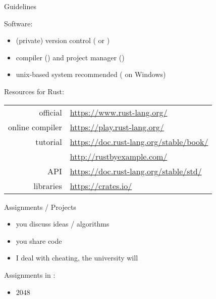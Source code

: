 \documentclass[10pt]{beamer}
\begin{document}
\begin{frame}{Guidelines}

Software:
\medskip
\begin{itemize}
  \item (private) version control ( or )
  \item {} compiler () and project manager ()
  \item unix-based system recommended ( on Windows)
\end{itemize}
\bigskip

\pause

Resources for Rust:\\
\medskip
\begin{tabular}{r l}
  official & \url{https://www.rust-lang.org/} \\
  online compiler & \url{https://play.rust-lang.org/} \\
  tutorial & \url{https://doc.rust-lang.org/stable/book/} \\
  & \url{http://rustbyexample.com/} \\
  API & \url{https://doc.rust-lang.org/stable/std/} \\
  libraries & \url{https://crates.io/} \\
\end{tabular}

\end{frame}





\begin{frame}{Assignments / Projects}

\begin{itemize}
  \bigsep
  \item you  discuss ideas / algorithms
  \item you  share code
  \item I  deal with cheating, the university will
\end{itemize}
\bigskip

\pause

Assignments in :

\begin{itemize}
  \item \emph{$2048$}
\end{itemize}

\end{frame}
\end{document}
